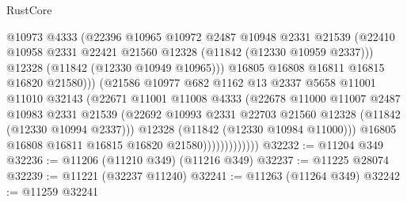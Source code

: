 \begin{lexlean}{RustCore}
\begin{coremodule}
                                @10973
                                @4333
                                (@22396
                                  @10965
                                  @10972
                                  @2487
                                  @10948
                                  @2331
                                  @21539
                                  (@22410
                                    @10958
                                    @2331
                                    @22421
                                    @21560
                                    @12328
                                    (@11842 (@12330 @10959 @2337)))
                                  @12328
                                  (@11842 (@12330 @10949 @10965)))
                                @16805
                                @16808
                                @16811
                                @16815
                                @16820
                                @21580)))
                          (@21586
                            @10977
                            @682
                            @1162
                            @13
                            @2337
                            @5658
                            @11001
                            @11010
                            @32143
                            (@22671
                              @11001
                              @11008
                              @4333
                              (@22678
                                @11000
                                @11007
                                @2487
                                @10983
                                @2331
                                @21539
                                (@22692
                                  @10993
                                  @2331
                                  @22703
                                  @21560
                                  @12328
                                  (@11842 (@12330 @10994 @2337)))
                                @12328
                                (@11842 (@12330 @10984 @11000)))
                              @16805
                              @16808
                              @16811
                              @16815
                              @16820
                              @21580)))))))))))))
@32232 := @11204 @349
@32236 := @11206 (@11210 @349) (@11216 @349)
@32237 := @11225 @28074
@32239 := @11221 (@32237 @11240)
@32241 := @11263 (@11264 @349)
@32242 := @11259 @32241

\end{coremodule}
\end{lexlean}
